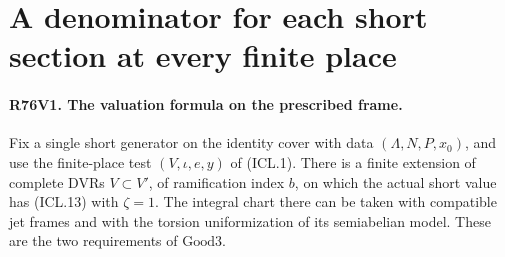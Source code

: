 \section{A denominator for each short section at every finite place}

\paragraph{R76V1. The valuation formula on the prescribed frame.}
Fix a single short generator on the identity cover with data
$(\Lambda,N,P,x_0)$, and use the finite-place test $(V,\iota,e,y)$ of
(ICL.1). There is a finite extension of complete DVRs $V\subset V'$,
of ramification index $b$, on which the actual short value has
(ICL.13) with $\zeta=1$. The integral chart there can be taken
with compatible jet frames and with the torsion uniformization of
its semiabelian model. These are the two requirements of
$\mathrm{Good3}$.

